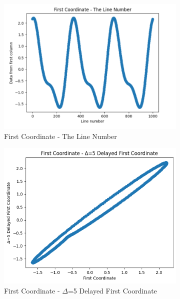 \begin{figure}[H]
\centering
    \begin{subfigure}{0.45\textwidth}
        \includegraphics[width=\linewidth]
        {images/task4_wlinenumber.png}
        \caption{First Coordinate - The Line Number}
        \label{task4_1}
    \end{subfigure}
    \begin{subfigure}{0.45\textwidth}
        \includegraphics[width=\linewidth]
        {images/task4_d5delayedfirstcoordinate.png}
        \caption{First Coordinate - $\Delta$=5 Delayed First Coordinate}
        \label{task4_2}
    \end{subfigure}
    
    \caption{}
\end{figure}


